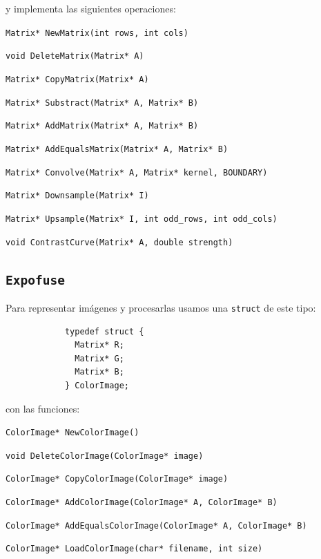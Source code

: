 \documentclass[a4paper,10pt]{article}
\begin{document}
            y implementa las siguientes operaciones:
            
            \texttt{Matrix* NewMatrix(int rows, int cols)}
            
            \texttt{void DeleteMatrix(Matrix* A)}
            
            \texttt{Matrix* CopyMatrix(Matrix* A)}
            
            \texttt{Matrix* Substract(Matrix* A, Matrix* B)}
            
            \texttt{Matrix* AddMatrix(Matrix* A, Matrix* B)}
            
            \texttt{Matrix* AddEqualsMatrix(Matrix* A, Matrix* B)}
            
            \texttt{Matrix* Convolve(Matrix* A, Matrix* kernel, BOUNDARY)}
            
            \texttt{Matrix* Downsample(Matrix* I)}
            
            \texttt{Matrix* Upsample(Matrix* I, int odd\_rows, int odd\_cols)}
            
            \texttt{void ContrastCurve(Matrix* A, double strength)}
        
        \subsection{\texttt{Expofuse}}
            Para representar imágenes y procesarlas usamos una \texttt{struct} de este tipo:
            
            \begin{verbatim}
            typedef struct {
              Matrix* R;
              Matrix* G;
              Matrix* B;
            } ColorImage;\end{verbatim}
            
            con las funciones:
            
            \texttt{ColorImage* NewColorImage()}

            \texttt{void DeleteColorImage(ColorImage* image)}

            \texttt{ColorImage* CopyColorImage(ColorImage* image)}

            \texttt{ColorImage* AddColorImage(ColorImage* A, ColorImage* B)}

            \texttt{ColorImage* AddEqualsColorImage(ColorImage* A, ColorImage* B)}

            \texttt{ColorImage* LoadColorImage(char* filename, int size)}
\end{document}
